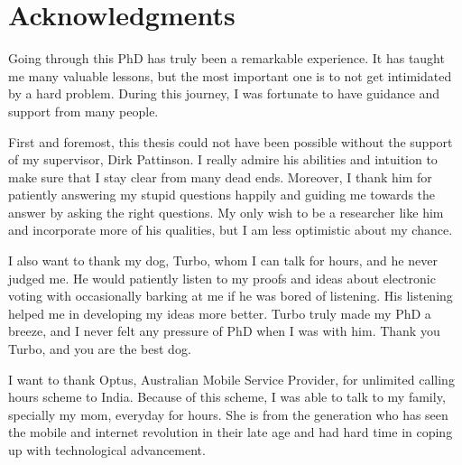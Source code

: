 \chapter*{Acknowledgments}
\setlength{\parindent}{2em}
\setlength{\parskip}{1em}
Going through this PhD has truly been a remarkable experience.  It has taught me many valuable lessons, 
but the most important one is to not get intimidated by a hard problem.  During this journey, I 
was fortunate to have guidance and support from many people. 	


First and foremost, this thesis could not have been possible without the support of my supervisor, Dirk Pattinson. I really 
admire his abilities and intuition to make sure that I stay clear from many dead ends. Moreover, 
I thank him for patiently answering my stupid questions happily and guiding me towards the
answer by asking the right questions. My only wish to be a researcher like 
him and incorporate more of his qualities, but I am less optimistic about my chance. 

I also want to thank my dog, Turbo, whom I can talk for hours, and he never judged me. He 
would patiently listen to my proofs
and ideas about electronic voting with occasionally barking at me if he was bored of listening. 
His listening helped me in developing my ideas more better. 
Turbo truly made my PhD a breeze, and I never felt any pressure of PhD when I was with him. Thank you
Turbo, and you are the best dog. 


I want to thank Optus, Australian Mobile Service Provider, for unlimited calling hours scheme to India. 
Because of this scheme, I was able to talk to my family, specially my mom, everyday for hours. She is from the generation 
who has seen the mobile and internet revolution in their late age and had hard time in coping up with
technological advancement. 
 
